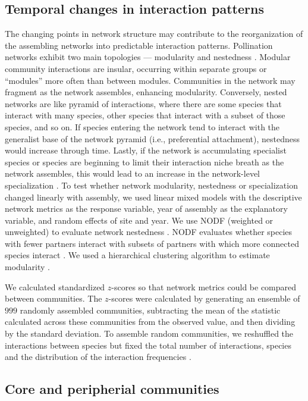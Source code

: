 \documentclass[12pt]{article}
\begin{document}
\subsection*{Temporal changes in interaction patterns}

The changing points in network structure may contribute to the
reorganization of the assembling networks into predictable interaction
patterns. Pollination networks exhibit two main topologies ---
modularity \citep[e.g.,][]{Olesen2007} and nestedness
\citep[e.g.,][]{Bascompte2006, Bascompte2003}. Modular community
interactions are insular, occurring within separate groups or
``modules'' more often than between modules. Communities in the
network may fragment as the network assembles, enhancing
modularity. Conversely, nested networks are like pyramid of
interactions, where there are some species that interact with many
species, other species that interact with a subset of those species,
and so on. If species entering the network tend to interact with the
generalist base of the network pyramid (i.e., preferential
attachment), nestedness would increase through time. Lastly, if the
network is accumulating specialist species or species are beginning to
limit their interaction niche breath as the network assembles, this
would lead to an increase in the network-level specialization
\citep{bluthgen-2006-9}. To test whether network modularity,
nestedness or specialization changed linearly with assembly, we used
linear mixed models with the descriptive network metrics as the
response variable, year of assembly as the explanatory variable, and
random effects of site and year. We use NODF (weighted or unweighted)
to evaluate network nestedness \citep{nodf}. NODF evaluates whether
species with fewer partners interact with subsets of partners with
which more connected species interact \citep{nodf}. We used a
hierarchical clustering algorithm to estimate modularity
\citep{Newman2004, igraph}.

We calculated standardized $z$-scores so that network metrics could be
compared between communities. The $z$-scores were calculated by
generating an ensemble of $999$ randomly assembled communities,
subtracting the mean of the statistic calculated across these
communities from the observed value, and then dividing by the standard
deviation. To assemble random communities, we reshuffled the
interactions between species but fixed the total number of
interactions, species and the distribution of the interaction
frequencies \citep{Galeano2009}.

\subsection*{Core and peripherial communities}
\end{document}
